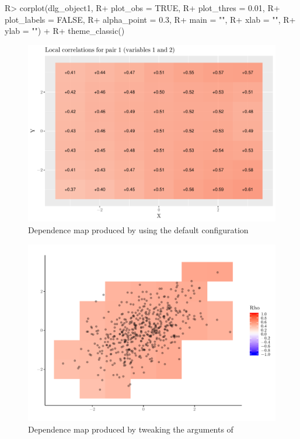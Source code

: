 \begin{example}
R> corplot(dlg_object1, 
R+         plot_obs = TRUE, 
R+         plot_thres = 0.01,
R+         plot_labels = FALSE,
R+         alpha_point = 0.3,
R+         main = "",
R+         xlab = "",
R+         ylab = "") +
R+   theme_classic()
\end{example}

\begin{figure}[p]
\centering 
\includegraphics[width = \textwidth]{graphics1} 
\caption{Dependence map produced by  using the default configuration}
\label{fig:graphics1}
\end{figure}


\begin{figure}[p]
\centering 
\includegraphics[width = \textwidth]{graphics2} 
\caption{Dependence map produced by tweaking the arguments of }
\label{fig:graphics2}
\end{figure}



\address{H{\aa}kon Otneim\\
  Department of Business and Management Science, \\
  NHH Norwegian School of Economics, \\
  Helleveien 30, 5045 BERGEN\\
  Norway\\
  }

